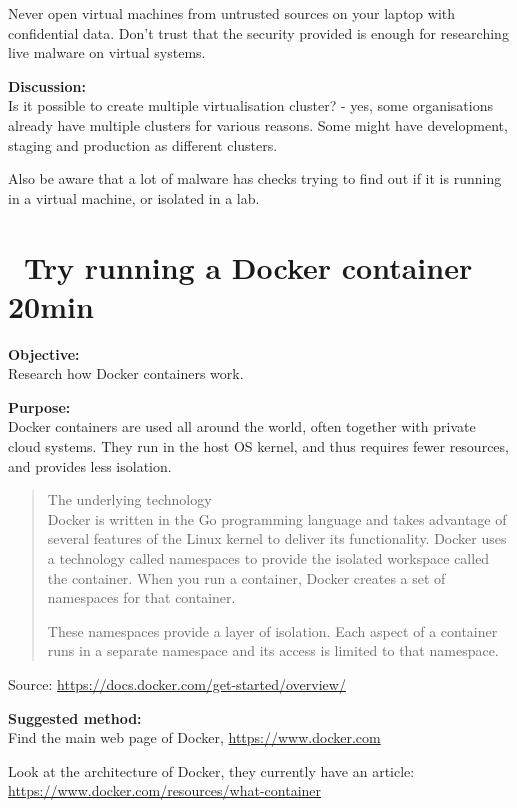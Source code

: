 \documentclass[a4paper,11pt,notitlepage]{report}
\begin{document}
Never open virtual machines from untrusted sources on your laptop with confidential data. Don't trust that the security provided is enough for researching live malware on virtual systems.

{\bf Discussion:}\\
Is it possible to create multiple virtualisation cluster? - yes, some organisations already have multiple clusters for various reasons. Some might have development, staging and production as different clusters.

Also be aware that a lot of malware has checks trying to find out if it is running in a virtual machine, or isolated in a lab.




\chapter{\faInfoCircle\ Try running a Docker container 20min}
\label{ex:docker-run}


{\bf Objective:}\\
Research how Docker containers work.

{\bf Purpose:}\\
Docker containers are used all around the world, often together with private cloud systems.
They run in the host OS kernel, and thus requires fewer resources, and provides less isolation.

\begin{quote}\small
The underlying technology\\
Docker is written in the Go programming language and takes advantage of several features of the Linux kernel to deliver its functionality. Docker uses a technology called namespaces to provide the isolated workspace called the container. When you run a container, Docker creates a set of namespaces for that container.

These namespaces provide a layer of isolation. Each aspect of a container runs in a separate namespace and its access is limited to that namespace.
\end{quote}
Source: \url{https://docs.docker.com/get-started/overview/}

{\bf Suggested method:}\\
Find the main web page of Docker, \url{https://www.docker.com}

Look at the architecture of Docker, they currently have an article:\\
\url{https://www.docker.com/resources/what-container}
\end{document}
